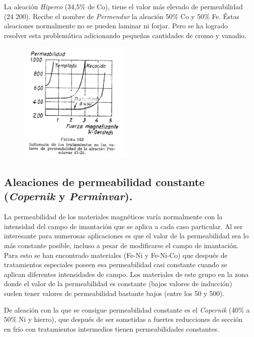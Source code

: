 \documentclass[12pt,a4paper]{article}
\begin{document}
La aleación \textit{Hiperco} (34,5\% de Co), tiene el valor más elevado de permeabilidad (24 200). Recibe el nombre de \textit{Permendur} la aleación 50\% Co y 50\% Fe. Éstas aleaciones normalmente no se pueden laminar ni forjar. Pero se ha logrado resolver esta problemática adicionando pequeñas cantidades de cromo y vanadio.

\begin{figure}[H]    
    \centering         
    \includegraphics[width=0.5\textwidth]{IMAGENES LATEX/9.jpg}
\end{figure}

\subsection{Aleaciones de permeabilidad constante (\textit{Copernik} y \textit{Perminvar}).}

La permeabilidad de los materiales magnéticos varía normalmente con la intensidad del campo de imantación que se aplica a cada caso particular. Al ser interesante para numerosas aplicaciones es que el valor de la permeabilidad sea lo más constante posible, incluso a pesar de modificarse el campo de imantación. Para esto se han encontrado materiales (Fe-Ni y Fe-Ni-Co) que después de tratamientos especiales poseen esa permeabilidad casi constante cuando se aplican diferentes intensidades de campo. Los materiales de este grupo en la zona donde el valor de la permeabilidad es constante (bajos valores de inducción) suelen tener valores de permeabilidad bastante bajos (entre los 50 y 500).

De aleación con la que se consigue permeabilidad constante es el \textit{Copernik} (40\% a 50\% Ni y hierro), que después de ser sometidas a fuertes reducciones de sección en frío con tratamientos intermedios tienen permeabilidades constantes.
\end{document}
